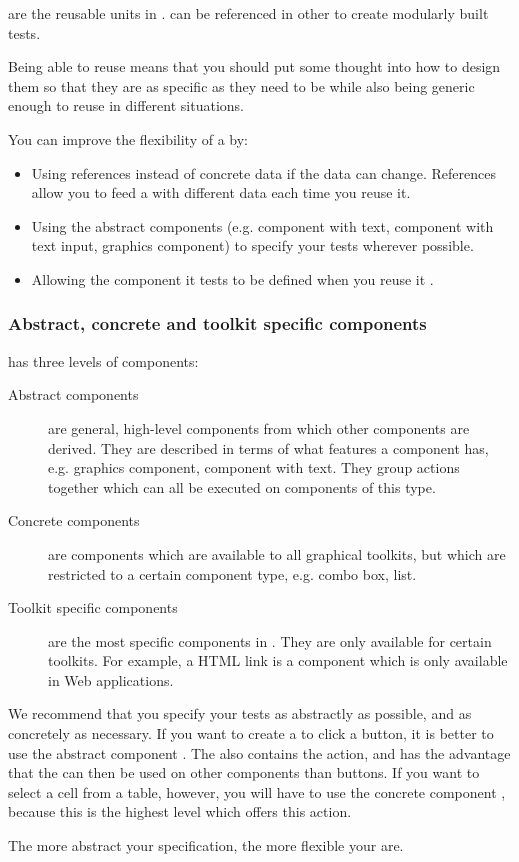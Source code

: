 \gdcases{} are the reusable units in \app{}. \gdcases{} can be referenced in other \gdcases{} to create modularly built tests. 

Being able to reuse \gdcases{} means that you should put some thought into how to design them so that they are as specific as they need to be while also being generic enough to reuse in different situations. 

You can improve the flexibility of a \gdcase{} by:

\begin{itemize}
\item Using references  instead of concrete data if the data can change. References allow you to feed a \gdcase{} with different data each time you reuse it. 
\item Using the abstract components (e.g. component with text, component with text input, graphics component)  to specify your tests wherever possible. 
\item Allowing the component it tests to be defined when you reuse it . 
\end{itemize}


\subsubsection{Abstract, concrete and toolkit specific components}
\label{ConceptsAbstractComps}

\app{} has three levels of components:
\begin{description}
\item [Abstract components]{are general, high-level components from which other components are derived. They are described in terms of what features a component has, e.g. graphics component, component with text. They group actions together which can all be executed on components of this type.}
\item [Concrete components]{are components which are available to all graphical toolkits, but which are restricted to a certain component type, e.g. combo box, list.}
\item [Toolkit specific components]{are the most specific components in \app{}. They are only available for certain toolkits. For example, a HTML link is a component which is only available in Web applications.}
\end{description}

We recommend that you specify your tests as abstractly as possible, and as concretely as necessary. If you want to create a \gdcase{} to click a button, it is better to use the abstract component . The  also contains the  action, and has the advantage that the \gdcase{} can then be used on other components than buttons. If you want to select a cell from a table, however, you will have to use the concrete component , because this is the highest level which offers this action. 

The more abstract your specification, the more flexible your \gdcases{} are. 


